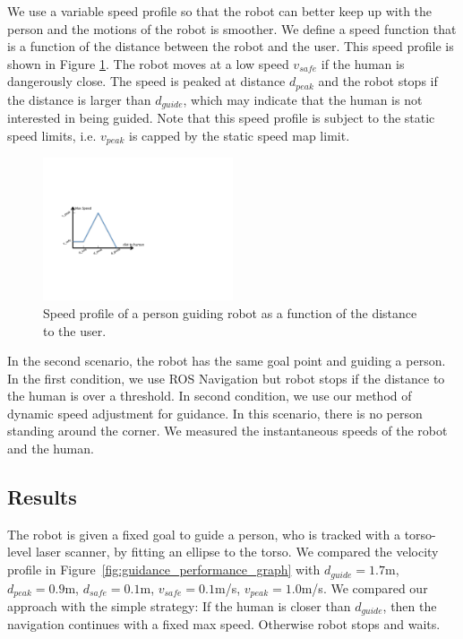 \documentclass[12pt]{gatech-thesis}
\begin{document}
We use a variable speed profile so that the robot can better keep up with the person and the motions of the robot is smoother. We define a speed function that is a function of the distance between the robot and the user. This speed profile is shown in Figure \ref{fig:guidance_speed_profile}. The robot moves at a low speed $v_{safe}$ if the human is dangerously close. The speed is peaked at distance $d_{peak}$ and the robot stops if the distance is larger than $d_{guide}$, which may indicate that the human is not interested in being guided. Note that this speed profile is subject to the static speed limits, i.e. $v_{peak}$ is capped by the static speed map limit.

\begin{figure}[ht!]
\centering
\includegraphics[width=0.5\textwidth]{pics/speed_profile_cropped}
\caption{Speed profile of a person guiding robot as a function of the distance to the user.}
\label{fig:guidance_speed_profile}
\end{figure}

In the second scenario, the robot has the same goal point and guiding a person. In the first condition, we use ROS Navigation but robot stops if the distance to the human is over a threshold. In second condition, we use our method of dynamic speed adjustment for guidance. In this scenario, there is no person standing around the corner. We measured the instantaneous speeds of the robot and the human.


\subsection{Results}

The robot is given a fixed goal to guide a person, who is tracked with a torso-level laser scanner, by fitting an ellipse to the torso. We compared the velocity profile in Figure~\ref{fig:guidance_performance_graph} with $d_{guide}=1.7$m, $d_{peak}=0.9$m, $d_{safe}=0.1$m, $v_{safe}=0.1$m/s, $v_{peak}=1.0$m/s. We compared our approach with the simple strategy: If the human is closer than $d_{guide}$, then the navigation continues with a fixed max speed. Otherwise robot stops and waits.
\end{document}
